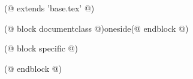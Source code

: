 (@ extends 'base.tex' @)

(@ block documentclass @)oneside(@ endblock @)

(@ block specific @)


(@ endblock @)
